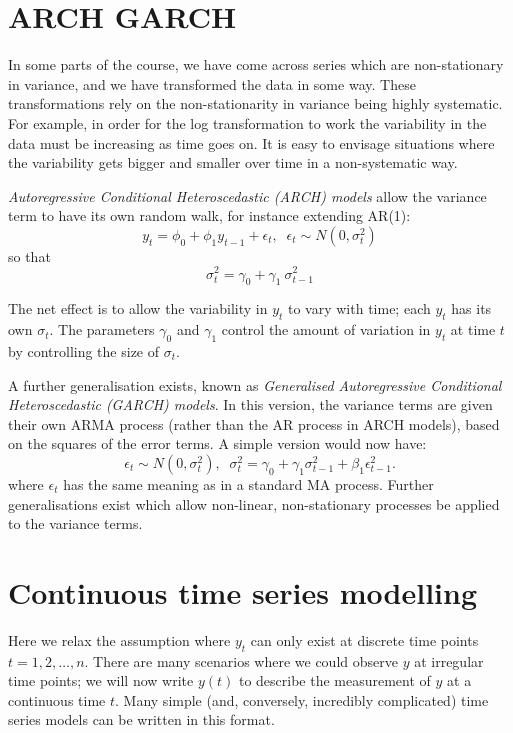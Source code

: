 \documentclass[a4paper,11pt,oneside,onecolumn]{book}
\begin{document}
\section{ARCH GARCH}

\label{sec:arch}
In some parts of the course, we have come across series which are non-stationary in variance, and we have transformed the data in some way. These transformations rely on the non-stationarity in variance being highly systematic. For example, in order for the log transformation to work the variability in the data must be increasing as time goes on. It is easy to envisage situations where the variability gets bigger and smaller over time in a non-systematic way. 

\begin{definition}[ARCH]
\textit{Autoregressive Conditional Heteroscedastic (ARCH) models} allow the variance term to have its own random walk, for instance extending AR(1):
\[ y_t = \phi_0 + \phi_1 y_{t-1} + \epsilon_t,\; \; \epsilon_t \sim N(0,\sigma_t^2) \]
so that
\[  \sigma_t^2 = \gamma_0 + \gamma_1\  \sigma_{t-1}^2 \]
\end{definition}
The net effect is to allow the variability in $y_t$ to vary with time; each $y_t$ has its own $\sigma_t$. The parameters $\gamma_0$ and $\gamma_1$ control the amount of variation in $y_t$ at time $t$ by controlling the size of $\sigma_t$.

\begin{definition}[GARCH]
A further generalisation exists, known as \textit{Generalised Autoregressive Conditional Heteroscedastic (GARCH) models}. In this version, the variance terms are given their own ARMA process (rather than the AR process in ARCH models), based on the squares of the error terms. A simple version would now have:
\[ \epsilon_t \sim N(0,\sigma_t^2),\;\; \sigma_t^2 = \gamma_0 + \gamma_1 \sigma_{t-1}^2 + \beta_1 \epsilon_{t-1}^2. \]
where $\epsilon_t$ has the same meaning as in a standard MA process. Further generalisations exist which allow non-linear, non-stationary processes be applied to the variance terms.
\end{definition}


\section{Continuous time series modelling}

Here we relax the assumption where $y_t$ can only exist at discrete time points $t=1,2,\ldots,n$. There are many scenarios where we could observe $y$ at irregular time points; we will now write $y(t)$ to describe the measurement of $y$ at a continuous time $t$. Many simple (and, conversely, incredibly complicated) time series models can be written in this format.
\end{document}
